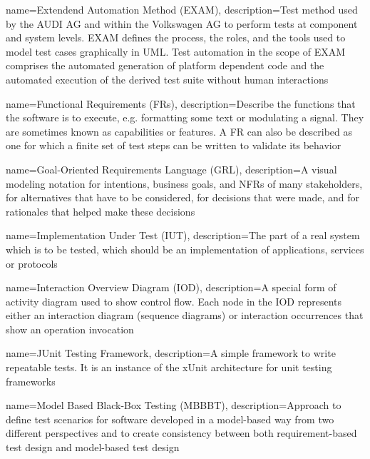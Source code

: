 {
	name={Extendend Automation Method (EXAM)},
	description={Test method used by the AUDI AG and within the Volkswagen AG to perform tests at component and system levels. EXAM defines the process, the roles, and the tools used to model test cases graphically in UML. Test automation in the scope of EXAM comprises the automated generation of platform dependent code and the automated execution of the derived test suite without human interactions \cite{Siegl2010}}
}

{
	name={Functional Requirements (FRs)},
	description={Describe the functions that the software is to execute, e.g. formatting some text or modulating a signal. They are sometimes known as capabilities or features. A FR can also be described as one for which a finite set of test steps can be written to validate its behavior \cite{SWEBOK}}
}

{
	name={Goal-Oriented Requirements Language (GRL)},
	description={A visual modeling notation for intentions, business goals, and NFRs of many stakeholders, for alternatives that have to be considered, for decisions that were made, and for rationales that helped make these decisions \cite{Amyot2011}}
}

{
	name={Implementation Under Test (IUT)},
	description={The part of a real system which is to be tested, which should be an implementation of applications, services or protocols \cite{ETSI2021}}
}

{
	name={Interaction Overview Diagram (IOD)},
	description={A special form of activity diagram used to show control flow. Each node in the IOD represents either an interaction diagram (sequence diagrams) or interaction occurrences that show an operation invocation \cite{NajlaRaza2007}}
}

{
	name={JUnit Testing Framework},
	description={A simple framework to write repeatable tests. It is an instance of the xUnit architecture for unit testing frameworks \cite{JUnit4}}
}

{
	name={Model Based Black-Box Testing (MBBBT)},
	description={Approach to define test scenarios for software developed in a model-based way from two different perspectives and to create consistency between both requirement-based test design and model-based test design \cite{Conrad2005}}
}

